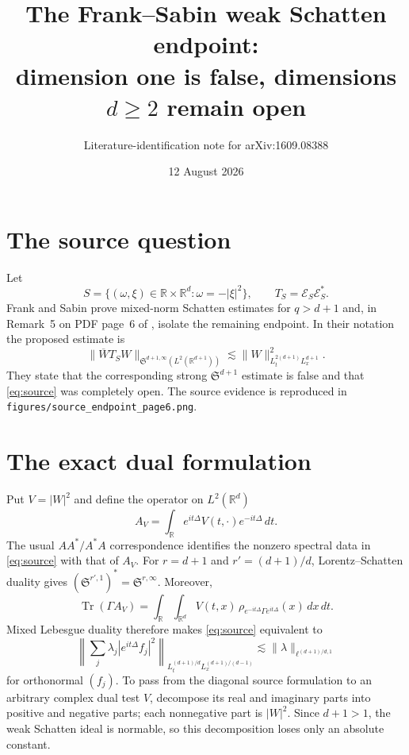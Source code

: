 \documentclass[11pt]{article}
\title{The Frank--Sabin weak Schatten endpoint:\\
dimension one is false, dimensions $d\ge2$ remain open}
\author{Literature-identification note for arXiv:1609.08388}
\date{12 August 2026}
\newcommand{\Sp}{\mathfrak S}
\newcommand{\R}{\mathbb R}
\begin{document}
\maketitle

\begin{center}
\end{center}

\section{The source question}

Let
\[
 S=\{(\omega,\xi)\in\R\times\R^d:\omega=-|\xi|^2\},
 \qquad T_S=\mathcal E_S\mathcal E_S^*.
\]
Frank and Sabin prove mixed-norm Schatten estimates for $q>d+1$ and, in
Remark~5 on PDF page~6 of \cite{FS16}, isolate the remaining endpoint.  In
their notation the proposed estimate is
\begin{equation}\label{eq:source}
 \|\overline W T_S W\|_{\Sp^{d+1,\infty}(L^2(\R^{d+1}))}
 \lesssim
 \|W\|_{L_t^{2(d+1)}L_x^{d+1}}^2 .
\end{equation}
They state that the corresponding strong $\Sp^{d+1}$ estimate is false and
that \eqref{eq:source} was completely open.  The source evidence is reproduced
in \texttt{figures/source\_endpoint\_page6.png}.

\section{The exact dual formulation}

Put $V=|W|^2$ and define the operator on $L^2(\R^d)$
\[
 A_V=\int_{\R} e^{it\Delta}V(t,\cdot)e^{-it\Delta}\,dt .
\]
The usual $AA^*/A^*A$ correspondence identifies the nonzero spectral data in
\eqref{eq:source} with that of $A_V$.  For
\(r=d+1\) and \(r'=(d+1)/d\), Lorentz--Schatten duality gives
\((\Sp^{r',1})^*=\Sp^{r,\infty}\).  Moreover,
\begin{equation}\label{eq:pairing}
 \operatorname{Tr}(\Gamma A_V)
 =\int_{\R}\!\int_{\R^d}
 V(t,x)\,\rho_{e^{-it\Delta}\Gamma e^{it\Delta}}(x)\,dx\,dt .
\end{equation}
Mixed Lebesgue duality therefore makes \eqref{eq:source} equivalent to
\begin{equation}\label{eq:density}
 \left\|\sum_j\lambda_j|e^{it\Delta}f_j|^2\right\|_
 {L_t^{(d+1)/d}L_x^{(d+1)/(d-1)}}
 \lesssim \|\lambda\|_{\ell^{(d+1)/d,1}}
\end{equation}
for orthonormal $(f_j)$.  To pass from the diagonal source formulation to an
arbitrary complex dual test $V$, decompose its real and imaginary parts into
positive and negative parts; each nonnegative part is $|W|^2$.  Since
$d+1>1$, the weak Schatten ideal is normable, so this decomposition loses only
an absolute constant.
\end{document}
